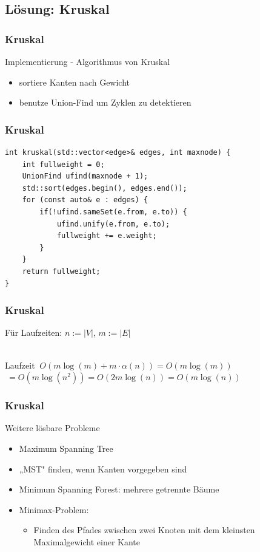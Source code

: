 \subsection{Lösung: Kruskal}

\begin{frame}
\frametitle{Kruskal}
\begin{block}{Implementierung - Algorithmus von Kruskal}
\begin{itemize}
\item sortiere Kanten nach Gewicht
\item benutze Union-Find um Zyklen zu detektieren
\end{itemize}
\end{block}
\end{frame}


\begin{frame}[fragile]
\frametitle{Kruskal}
\begin{lstlisting}[basicstyle=\footnotesize]
int kruskal(std::vector<edge>& edges, int maxnode) {
    int fullweight = 0;
    UnionFind ufind(maxnode + 1);
    std::sort(edges.begin(), edges.end());
    for (const auto& e : edges) {
        if(!ufind.sameSet(e.from, e.to)) {
            ufind.unify(e.from, e.to);
            fullweight += e.weight;
        }
    }
    return fullweight;
}
\end{lstlisting}
\end{frame}

\begin{frame}
\frametitle{Kruskal}
Für Laufzeiten: $n:=|V|$, $m:=|E|$ \\~\\
\begin{block}{Laufzeit}
$\ O(m\log(m)+ m\cdot\alpha(n))=O(m\log(m))$\\$\ =O(m\log(n^2))=O(2m\log(n))=O(m\log(n))$

\end{block}
\end{frame}


\begin{frame}
\frametitle{Kruskal}
\begin{block}{Weitere lösbare Probleme}
\begin{itemize}
\item Maximum Spanning Tree
\item „MST" finden, wenn Kanten vorgegeben sind
\item Minimum Spanning Forest: mehrere getrennte Bäume
\item Minimax-Problem:
\begin{itemize}
\item Finden des Pfades zwischen zwei Knoten mit dem kleinsten Maximalgewicht einer Kante
\end{itemize}
\end{itemize}
\end{block}
\end{frame}
